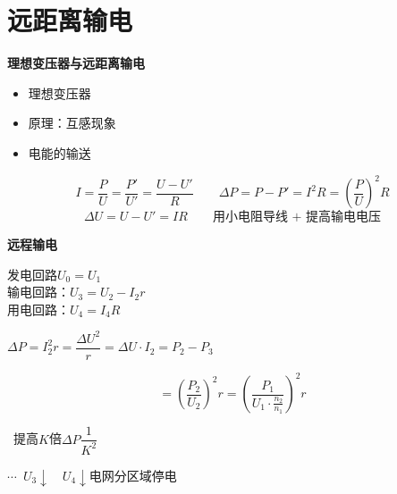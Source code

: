 \noindent {}


\section{远距离输电}
\textbf{理想变压器与远距离输电}
\begin{itemize}
\item 理想变压器
\item 原理：互感现象
\item 电能的输送
\end{itemize}
\[
I=\frac{P}{U}=\frac{P'}{U'}=\frac{U-U'}{R}\qquad \Delta P=P-P'=I^2R=\left(\frac{P}{U}\right)^2R
\]
\[
\Delta U=U-U'=IR\qquad \text{用小电阻导线 + 提高输电电压}
\]

\textbf{远程输电}

\noindent 发电回路\quad $U_0=U_1$\\
输电回路：$U_3=U_2-I_2r$\\
用电回路：$U_4=I_4R$

\noindent {}%
\quad $\Delta P=I_2^2r=\dfrac{\Delta U^2}{r}=\Delta U\cdot I_2=P_2-P_3$

\[
=\left(\frac{P_2}{U_2}\right)^2r=\left(\frac{P_1}{U_1\cdot\frac{n_2}{n_1}}\right)^2r
\]%

\noindent {}\ 提高$K$倍\quad $\Delta P$$\dfrac{1}{K^2}$%

\noindent {}

\noindent $\cdots$\ $U_3\downarrow$\ \ $U_4\downarrow$\quad 电网分区域停电%

